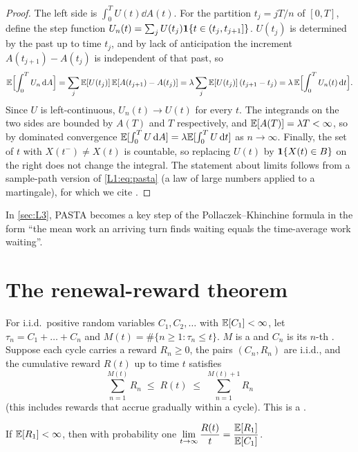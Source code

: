 \begin{proof}
The left side is $\int_0^TU(t)\dd A(t)$. For the partition $t_j=jT/n$ of $[0,T]$,
define the step function $U_n(t)=\sum_{j}U(t_j)\mathbf{1}\{t\in(t_j,t_{j+1}]\}$. $U(t_j)$ is
determined by the past up to time $t_j$, and by lack of anticipation the increment
$A(t_{j+1})-A(t_j)$ is independent of that past, so
\[
  \mathbb{E}\Bigl[\int_0^TU_n\,\mathrm{d} A\Bigr]=\sum_j\mathbb{E}[U(t_j)]\,\mathbb{E}[A(t_{j+1})-A(t_j)]
  =\lambda\sum_j\mathbb{E}[U(t_j)]\,(t_{j+1}-t_j)=\lambda\,\mathbb{E}\Bigl[\int_0^TU_n(t)\,\mathrm{d} t\Bigr].
\]
Since $U$ is left-continuous, $U_n(t)\to U(t)$ for every $t$. The integrands on the
two sides are bounded by $A(T)$ and $T$ respectively, and $\mathbb{E}[A(T)]=\lambda T<\infty$,
so by dominated convergence $\mathbb{E}[\int_0^TU\,\mathrm{d} A]=\lambda\mathbb{E}[\int_0^TU\,\mathrm{d} t]$ as
$n\to\infty$. Finally, the set of $t$ with $X(t^-)\ne X(t)$ is countable, so replacing
$U(t)$ by $\mathbf{1}\{X(t)\in B\}$ on the right does not change the integral.
The statement about limits follows from a sample-path version of
\eqref{L1:eq:pasta} (a law of large numbers applied to a martingale), for which we
cite \cite{wolff1982}.
\end{proof}

In \cref{sec:L3}, PASTA becomes a key step of the Pollaczek--Khinchine formula in the
form ``the mean work an arriving turn finds waiting equals the time-average work
waiting''.

\section{The renewal-reward theorem}

\begin{definition}\label{L1:def:renewal}
For i.i.d.\ positive random variables $C_1,C_2,\dots$ with $\mathbb{E}[C_1]<\infty$, let
$\tau_n=C_1+\dots+C_n$ and $M(t)=\#\{n\ge1:\tau_n\le t\}$. $M$ is a
 and $C_n$ is its $n$-th . Suppose each cycle
carries a reward $R_n\ge0$, the pairs $(C_n,R_n)$ are i.i.d., and the cumulative reward
$R(t)$ up to time $t$ satisfies
\[
  \sum_{n=1}^{M(t)}R_n\;\le\;R(t)\;\le\;\sum_{n=1}^{M(t)+1}R_n
\]
(this includes rewards that accrue gradually within a cycle). This is a
.
\end{definition}

\begin{theorem}\label{thm:renewal-reward}
If $\mathbb{E}[R_1]<\infty$, then with probability one
$\displaystyle\lim_{t\to\infty}\frac{R(t)}{t}=\frac{\mathbb{E}[R_1]}{\mathbb{E}[C_1]}$.
\end{theorem}

